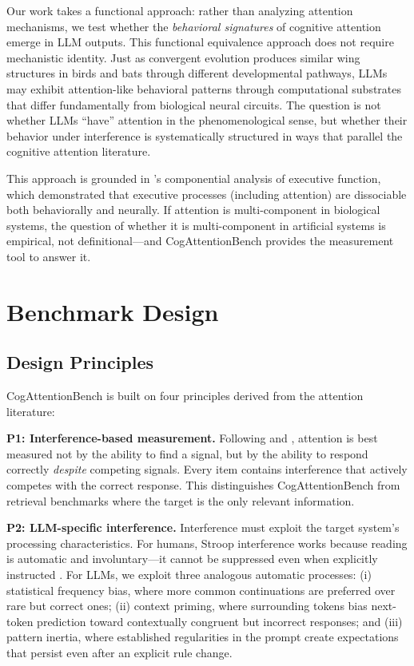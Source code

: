 \documentclass{article}
\begin{document}
Our work takes a functional approach: rather than analyzing attention mechanisms, we test whether the \emph{behavioral signatures} of cognitive attention emerge in LLM outputs. This functional equivalence approach does not require mechanistic identity. Just as convergent evolution produces similar wing structures in birds and bats through different developmental pathways, LLMs may exhibit attention-like behavioral patterns through computational substrates that differ fundamentally from biological neural circuits. The question is not whether LLMs ``have'' attention in the phenomenological sense, but whether their behavior under interference is systematically structured in ways that parallel the cognitive attention literature.

This approach is grounded in \citet{diamond2013}'s componential analysis of executive function, which demonstrated that executive processes (including attention) are dissociable both behaviorally and neurally. If attention is multi-component in biological systems, the question of whether it is multi-component in artificial systems is empirical, not definitional---and CogAttentionBench provides the measurement tool to answer it.

\section{Benchmark Design}

\subsection{Design Principles}

CogAttentionBench is built on four principles derived from the attention literature:

\textbf{P1: Interference-based measurement.} Following \citet{stroop1935} and \citet{eriksen1974}, attention is best measured not by the ability to find a signal, but by the ability to respond correctly \emph{despite} competing signals. Every item contains interference that actively competes with the correct response. This distinguishes CogAttentionBench from retrieval benchmarks where the target is the only relevant information.

\textbf{P2: LLM-specific interference.} Interference must exploit the target system's processing characteristics. For humans, Stroop interference works because reading is automatic and involuntary---it cannot be suppressed even when explicitly instructed \citep{macleod1991}. For LLMs, we exploit three analogous automatic processes: (i) statistical frequency bias, where more common continuations are preferred over rare but correct ones; (ii) context priming, where surrounding tokens bias next-token prediction toward contextually congruent but incorrect responses; and (iii) pattern inertia, where established regularities in the prompt create expectations that persist even after an explicit rule change.
\end{document}
